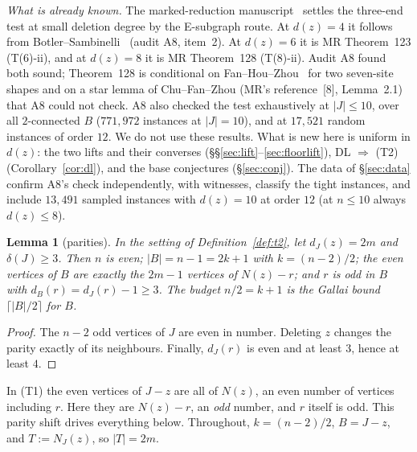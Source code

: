 \documentclass[11pt]{amsart}
\newtheorem{lemma}[theorem]{Lemma}
\theoremstyle{definition}
\theoremstyle{remark}
\renewcommand{\_}{\oldunderscore\allowbreak}
\begin{document}
\emph{What is already known.} The marked-reduction manuscript~\cite{MR} settles the three-end test
at small deletion degree by the E-subgraph route. At $d(z)=4$ it follows from Botler--Sambinelli~\cite{BS}
(audit A8, item~2). At $d(z)=6$ it is MR Theorem~123 (T(6)-ii), and at $d(z)=8$ it is MR Theorem~128
(T(8)-ii). Audit A8 found both sound; Theorem~128 is conditional on Fan--Hou--Zhou~\cite{FHZ} for two
seven-site shapes and on a star lemma of Chu--Fan--Zhou (MR's reference~[8], Lemma~2.1) that A8
could not check. A8 also checked
the test exhaustively at $|J|\le10$, over all $2$-connected $B$ ($771{,}972$ instances at
$|J|=10$), and at $17{,}521$ random instances of order $12$. We do not use these results. What is
new here is uniform in $d(z)$: the two lifts and their converses
(\S\S\ref{sec:lift}--\ref{sec:floorlift}), DL $\Rightarrow$ (T2) (Corollary~\ref{cor:dl}), and the
base conjectures (\S\ref{sec:conj}). The data of \S\ref{sec:data} confirm A8's check independently,
with witnesses, classify the tight instances, and include $13{,}491$ sampled instances with
$d(z)=10$ at order $12$ (at $n\le10$ always $d(z)\le8$).

\begin{lemma}[parities]\label{lem:par}
In the setting of Definition~\ref{def:t2}, let $d_J(z)=2m$ and $\delta(J)\ge3$. Then $n$ is even;
$|B|=n-1=2k+1$ with $k=(n-2)/2$; the even vertices of $B$ are exactly the $2m-1$ vertices of
$N(z)-r$; and $r$ is odd in $B$ with $d_B(r)=d_J(r)-1\ge3$. The budget $n/2=k+1$ is the Gallai
bound $\lceil |B|/2\rceil$ for $B$.
\end{lemma}

\begin{proof}
The $n-2$ odd vertices of $J$ are even in number. Deleting $z$ changes the parity exactly of its
neighbours. Finally, $d_J(r)$ is even and at least $3$, hence at least $4$.
\end{proof}

In (T1) the even vertices of $J-z$ are all of $N(z)$, an even number of vertices including $r$. Here
they are $N(z)-r$, an \emph{odd} number, and $r$ itself is odd. This parity shift drives everything
below.
Throughout, $k=(n-2)/2$, $B=J-z$, and $T:=N_J(z)$, so $|T|=2m$.
\end{document}
